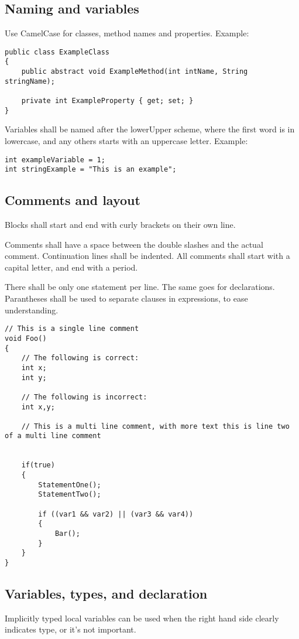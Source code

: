 \subsection{Naming and variables}
Use CamelCase for classes, method names and properties.
Example:
\begin{lstlisting}
public class ExampleClass
{
	public abstract void ExampleMethod(int intName, String stringName);
	
	private int ExampleProperty { get; set; }
}
\end{lstlisting}

Variables shall be named after the lowerUpper scheme, where the first word is in lowercase, and any others starts with an uppercase letter.
Example:\\
\begin{lstlisting}
int exampleVariable = 1;
int stringExample = "This is an example";
\end{lstlisting}

\subsection{Comments and layout}
Blocks shall start and end with curly brackets on their own line.

Comments shall have a space between the double slashes and the actual comment. Continuation lines shall be indented. All comments shall start with a capital letter, and end with a period.

There shall be only one statement per line. The same goes for declarations. Parantheses shall be used to separate clauses in expressions, to ease understanding.

\begin{lstlisting}
// This is a single line comment
void Foo()
{
	// The following is correct:
	int x;
	int y;
	
	// The following is incorrect:
	int x,y;
	
	// This is a multi line comment, with more text this is line two of a multi line comment

	
	if(true)
	{
		StatementOne();
		StatementTwo();
		
		if ((var1 && var2) || (var3 && var4))
		{
			Bar();
		}
	}
}
\end{lstlisting}

\subsection{Variables, types, and declaration}
Implicitly typed local variables can be used when the right hand side clearly indicates type, or it's not important.

